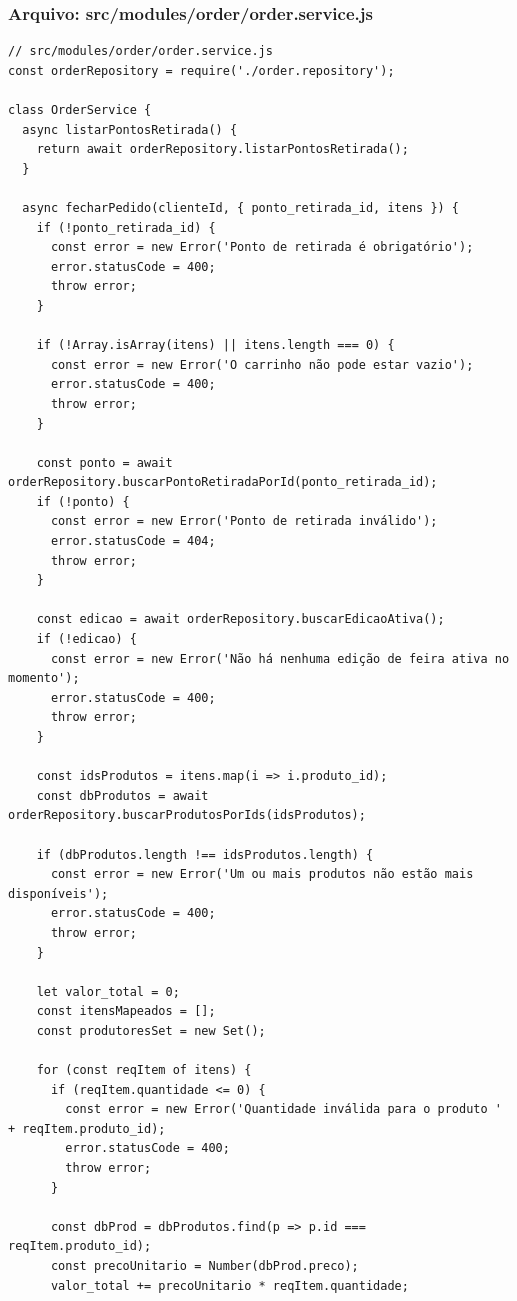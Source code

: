 \subsubsection*{Arquivo: src/modules/order/order.service.js}
\begin{lstlisting}[caption={src/modules/order/order.service.js}]
// src/modules/order/order.service.js
const orderRepository = require('./order.repository');

class OrderService {
  async listarPontosRetirada() {
    return await orderRepository.listarPontosRetirada();
  }

  async fecharPedido(clienteId, { ponto_retirada_id, itens }) {
    if (!ponto_retirada_id) {
      const error = new Error('Ponto de retirada é obrigatório');
      error.statusCode = 400;
      throw error;
    }

    if (!Array.isArray(itens) || itens.length === 0) {
      const error = new Error('O carrinho não pode estar vazio');
      error.statusCode = 400;
      throw error;
    }

    const ponto = await orderRepository.buscarPontoRetiradaPorId(ponto_retirada_id);
    if (!ponto) {
      const error = new Error('Ponto de retirada inválido');
      error.statusCode = 404;
      throw error;
    }

    const edicao = await orderRepository.buscarEdicaoAtiva();
    if (!edicao) {
      const error = new Error('Não há nenhuma edição de feira ativa no momento');
      error.statusCode = 400;
      throw error;
    }

    const idsProdutos = itens.map(i => i.produto_id);
    const dbProdutos = await orderRepository.buscarProdutosPorIds(idsProdutos);

    if (dbProdutos.length !== idsProdutos.length) {
      const error = new Error('Um ou mais produtos não estão mais disponíveis');
      error.statusCode = 400;
      throw error;
    }

    let valor_total = 0;
    const itensMapeados = [];
    const produtoresSet = new Set();

    for (const reqItem of itens) {
      if (reqItem.quantidade <= 0) {
        const error = new Error('Quantidade inválida para o produto ' + reqItem.produto_id);
        error.statusCode = 400;
        throw error;
      }
      
      const dbProd = dbProdutos.find(p => p.id === reqItem.produto_id);
      const precoUnitario = Number(dbProd.preco);
      valor_total += precoUnitario * reqItem.quantidade;
      

\end{lstlisting}
